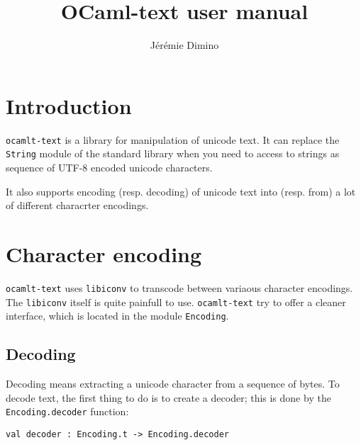 \documentclass{article}
\title{OCaml-text user manual}
\author{Jérémie Dimino}
\newcommand{\oct}{\texttt{ocamlt-text}\xspace}
\begin{document}
\maketitle


\setcounter{tocdepth}{2}
\tableofcontents

\section{Introduction}

\oct is a library for manipulation of unicode text. It can replace the
\texttt{String} module of the standard library when you need to access
to strings as sequence of UTF-8 encoded unicode characters.

It also supports encoding (resp. decoding) of unicode text into
(resp. from) a lot of different characrter encodings.

\section{Character encoding}

\oct uses \texttt{libiconv} to transcode between variaous character
encodings. The \texttt{libiconv} itself is quite painfull to use. \oct
try to offer a cleaner interface, which is located in the module
\texttt{Encoding}.

\subsection{Decoding}

Decoding means extracting a unicode character from a sequence of
bytes. To decode text, the first thing to do is to create a decoder;
this is done by the \texttt{Encoding.decoder} function:

\begin{verbatim}
val decoder : Encoding.t -> Encoding.decoder
\end{verbatim}
\end{document}
